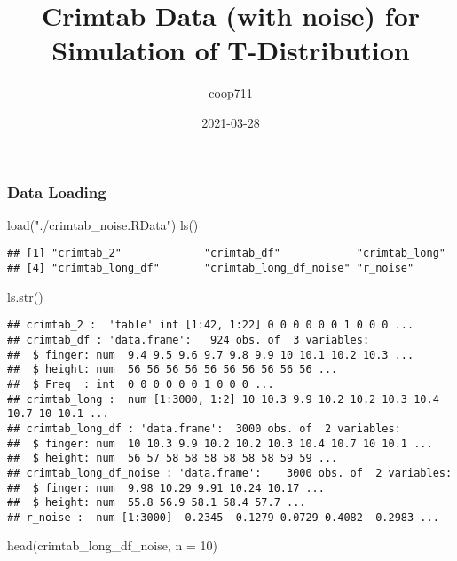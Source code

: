 \documentclass[
]{article}
\title{Crimtab Data (with noise) for Simulation of T-Distribution}
\author{coop711}
\date{2021-03-28}
\newenvironment{Shaded}{\begin{snugshade}}{\end{snugshade}}
\newcommand{\AttributeTok}[1]{\textcolor[rgb]{0.77,0.63,0.00}{#1}}
\newcommand{\DecValTok}[1]{\textcolor[rgb]{0.00,0.00,0.81}{#1}}
\newcommand{\FunctionTok}[1]{\textcolor[rgb]{0.00,0.00,0.00}{#1}}
\newcommand{\NormalTok}[1]{#1}
\newcommand{\StringTok}[1]{\textcolor[rgb]{0.31,0.60,0.02}{#1}}
\begin{document}
\maketitle

\hypertarget{data-loading}{%
\subsubsection{Data Loading}\label{data-loading}}

\begin{Shaded}
\begin{Highlighting}[]
\FunctionTok{load}\NormalTok{(}\StringTok{"./crimtab\_noise.RData"}\NormalTok{)}
\FunctionTok{ls}\NormalTok{()}
\end{Highlighting}
\end{Shaded}

\begin{verbatim}
## [1] "crimtab_2"             "crimtab_df"            "crimtab_long"         
## [4] "crimtab_long_df"       "crimtab_long_df_noise" "r_noise"
\end{verbatim}

\begin{Shaded}
\begin{Highlighting}[]
\FunctionTok{ls.str}\NormalTok{()}
\end{Highlighting}
\end{Shaded}

\begin{verbatim}
## crimtab_2 :  'table' int [1:42, 1:22] 0 0 0 0 0 0 1 0 0 0 ...
## crimtab_df : 'data.frame':   924 obs. of  3 variables:
##  $ finger: num  9.4 9.5 9.6 9.7 9.8 9.9 10 10.1 10.2 10.3 ...
##  $ height: num  56 56 56 56 56 56 56 56 56 56 ...
##  $ Freq  : int  0 0 0 0 0 0 1 0 0 0 ...
## crimtab_long :  num [1:3000, 1:2] 10 10.3 9.9 10.2 10.2 10.3 10.4 10.7 10 10.1 ...
## crimtab_long_df : 'data.frame':  3000 obs. of  2 variables:
##  $ finger: num  10 10.3 9.9 10.2 10.2 10.3 10.4 10.7 10 10.1 ...
##  $ height: num  56 57 58 58 58 58 58 58 59 59 ...
## crimtab_long_df_noise : 'data.frame':    3000 obs. of  2 variables:
##  $ finger: num  9.98 10.29 9.91 10.24 10.17 ...
##  $ height: num  55.8 56.9 58.1 58.4 57.7 ...
## r_noise :  num [1:3000] -0.2345 -0.1279 0.0729 0.4082 -0.2983 ...
\end{verbatim}

\begin{Shaded}
\begin{Highlighting}[]
\FunctionTok{head}\NormalTok{(crimtab\_long\_df\_noise, }\AttributeTok{n =} \DecValTok{10}\NormalTok{)}
\end{Highlighting}
\end{Shaded}
\end{document}
